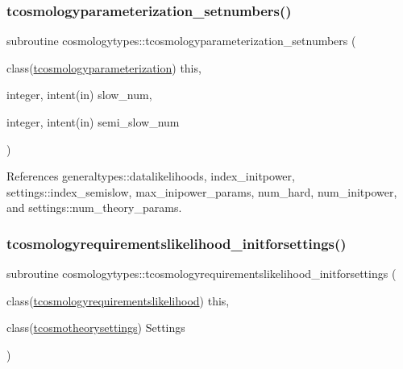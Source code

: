 \subsubsection{\texorpdfstring{tcosmologyparameterization\+\_\+setnumbers()}{tcosmologyparameterization\_setnumbers()}}
{\footnotesize\ttfamily subroutine cosmologytypes\+::tcosmologyparameterization\+\_\+setnumbers (\begin{DoxyParamCaption}\item[{class(\mbox{\hyperlink{structcosmologytypes_1_1tcosmologyparameterization}{tcosmologyparameterization}})}]{this,  }\item[{integer, intent(in)}]{slow\+\_\+num,  }\item[{integer, intent(in)}]{semi\+\_\+slow\+\_\+num }\end{DoxyParamCaption})}



References generaltypes\+::datalikelihoods, index\+\_\+initpower, settings\+::index\+\_\+semislow, max\+\_\+inipower\+\_\+params, num\+\_\+hard, num\+\_\+initpower, and settings\+::num\+\_\+theory\+\_\+params.

\mbox{\label{namespacecosmologytypes_ad425fc0ec36d3dd4e0eab7afb9a1afd8}} 
\subsubsection{\texorpdfstring{tcosmologyrequirementslikelihood\+\_\+initforsettings()}{tcosmologyrequirementslikelihood\_initforsettings()}}
{\footnotesize\ttfamily subroutine cosmologytypes\+::tcosmologyrequirementslikelihood\+\_\+initforsettings (\begin{DoxyParamCaption}\item[{class(\mbox{\hyperlink{structcosmologytypes_1_1tcosmologyrequirementslikelihood}{tcosmologyrequirementslikelihood}})}]{this,  }\item[{class(\mbox{\hyperlink{structcosmologytypes_1_1tcosmotheorysettings}{tcosmotheorysettings}})}]{Settings }\end{DoxyParamCaption})}

\mbox{\label{namespacecosmologytypes_aea692fd3455be240e80ab5de081b500e}} 
